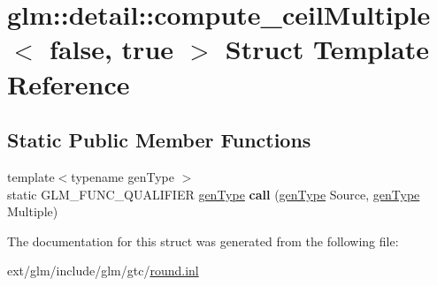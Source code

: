 \hypertarget{structglm_1_1detail_1_1compute__ceil_multiple_3_01false_00_01true_01_4}{\section{glm\-:\-:detail\-:\-:compute\-\_\-ceil\-Multiple$<$ false, true $>$ Struct Template Reference}
\label{structglm_1_1detail_1_1compute__ceil_multiple_3_01false_00_01true_01_4}
}
\subsection*{Static Public Member Functions}
\begin{DoxyCompactItemize}
\item 
\hypertarget{structglm_1_1detail_1_1compute__ceil_multiple_3_01false_00_01true_01_4_a065f8762eb2b48c4f746781fac7ab7f7}{{\footnotesize template$<$typename gen\-Type $>$ }\\static G\-L\-M\-\_\-\-F\-U\-N\-C\-\_\-\-Q\-U\-A\-L\-I\-F\-I\-E\-R \hyperlink{structglm_1_1detail_1_1gen_type}{gen\-Type} {\bfseries call} (\hyperlink{structglm_1_1detail_1_1gen_type}{gen\-Type} Source, \hyperlink{structglm_1_1detail_1_1gen_type}{gen\-Type} Multiple)}\label{structglm_1_1detail_1_1compute__ceil_multiple_3_01false_00_01true_01_4_a065f8762eb2b48c4f746781fac7ab7f7}

\end{DoxyCompactItemize}


The documentation for this struct was generated from the following file\-:\begin{DoxyCompactItemize}
\item 
ext/glm/include/glm/gtc/\hyperlink{round_8inl}{round.\-inl}\end{DoxyCompactItemize}
